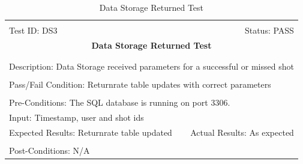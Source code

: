 \documentclass[11pt]{article}
\begin{document}
\begin{center}
\begin{table}[H]
\begin{tabular}{|l r|}\hline&\\[-2mm]
	Test ID: DS3	&Status: PASS\\[-3mm]
	\multicolumn{2}{|c|}{\textbf{\large{Data Storage Returned Test}}}\\&\\\hline&\\[-3mm]
	\multicolumn{2}{|p{\textwidth}|}{Description: Data Storage received parameters for a successful or missed shot}\\[1mm]\hline&\\[-3mm]
	\multicolumn{2}{|p{\textwidth}|}{Pass/Fail Condition: Returnrate table updates with correct parameters}\\[1mm]\hline&\\[-3mm]
	\multicolumn{2}{|p{\textwidth}|}{Pre-Conditions: The SQL database is running on port 3306.}\\[4mm]
	\multicolumn{2}{|p{\textwidth}|}{Input: Timestamp, user and shot ids}\\[2mm]\hline
	\multicolumn{1}{|p{0.49\textwidth}}{Expected Results: Returnrate table updated}	&\multicolumn{1}{|p{0.45\textwidth}|}{Actual Results: As expected}\\\hline&\\[-3mm]
	\multicolumn{2}{|p{\textwidth}|}{Post-Conditions: N/A}\\\hline
\end{tabular}
\caption{Data Storage Returned Test}
\end{table}
\end{center}
\end{document}
